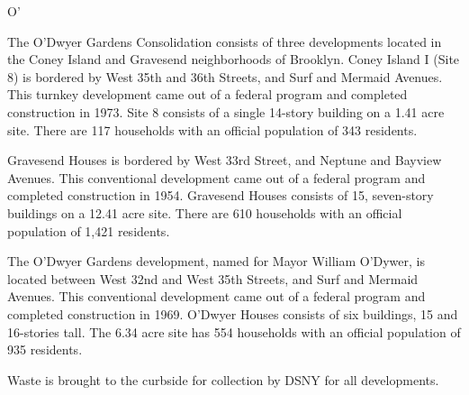 O'

The O'Dwyer Gardens Consolidation consists of three developments located in the Coney Island and Gravesend neighborhoods of Brooklyn. Coney Island I (Site 8) is bordered by West 35th and 36th Streets, and Surf and Mermaid Avenues. This turnkey development came out of a federal program and completed construction in 1973. Site 8 consists of a single 14-story building on a 1.41 acre site. There are 117 households with an official population of 343 residents.

Gravesend Houses is bordered by West 33rd Street, and Neptune and Bayview Avenues. This conventional development came out of a federal program and completed construction in 1954. Gravesend Houses consists of 15, seven-story buildings on a 12.41 acre site. There are 610 households with an official population of 1,421 residents. 

The O'Dwyer Gardens development, named for Mayor William O'Dywer, is located between West 32nd and West 35th Streets, and Surf and Mermaid Avenues. This conventional development came out of a federal program and completed construction in 1969. O'Dwyer Houses consists of six buildings, 15 and 16-stories tall. The 6.34 acre site has 554 households with an official population of 935 residents.

Waste is brought to the curbside for collection by DSNY for all developments.
